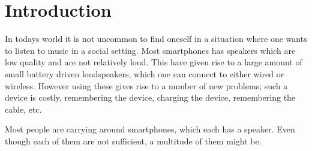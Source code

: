 \chapter{Introduction}\label{cha:introduction}
%
% 
%
%
%
%
%

In todays world it is not uncommon to find oneself in a situation where one wants to listen to music in a social setting.
Most smartphones has speakers which are low quality and are not relatively loud. 
This have given rise to a large amount of small battery driven loudspeakers, which one can connect to either wired or wireless.
However using these gives rise to a number of new problems; such a device is costly, remembering the device, charging the device, remembering the cable, etc.

Most people are carrying around smartphones, which each has a speaker.
Even though each of them are not sufficient, a multitude of them might be. 
